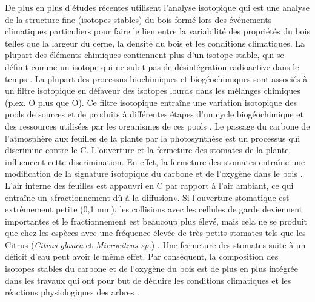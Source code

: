 \documentclass{report}
\begin{document}
De plus en plus d'études récentes utilisent l'analyse isotopique qui est une analyse de la structure fine (isotopes stables) du bois formé lors des événements climatiques particuliers pour faire le lien entre la variabilité des propriétés du bois telles que la largeur du cerne, la densité du bois et les conditions climatiques. La plupart des éléments chimiques contiennent plus d'un isotope stable, qui se définit comme un isotope qui ne subit pas de désintégration radioactive dans le temps \citep{West2006}. La plupart des processus biochimiques et biogéochimiques sont associés à un filtre isotopique en défaveur des isotopes lourds dans les mélanges chimiques (p.ex. O plus que O). Ce filtre isotopique entraîne une variation isotopique des pools de sources et de produits à différentes étapes d'un cycle biogéochimique et des ressources utilisées par les organismes de ces pools \citep{Dawson2002}. Le passage du carbone de l'atmosphère aux feuilles de la plante par la photosynthèse est un processus qui discrimine contre le C. L'ouverture et la fermeture des stomates de la plante influencent cette discrimination. En effet, la fermeture des stomates entraîne une modification de la signature isotopique du carbone et de l'oxygène dans le bois \citep{Farquhar1993, Bigras2005}. L'air interne des feuilles est appauvri en C par rapport à l'air ambiant, ce qui entraîne un «fractionnement dû à la diffusion». Si l'ouverture stomatique est extrêmement petite (0,1 mm), les collisions avec les cellules de garde deviennent importantes et le fractionnement est beaucoup plus élevé, mais cela ne se produit que chez les espèces avec une fréquence élevée de très petits stomates tels que les Citrus (\textit{Citrus glauca} et \textit{Microcitrus sp.}) \citep{Farquhar1993}. Une fermeture des stomates suite à un déficit d'eau peut avoir le même effet. Par conséquent, la composition des isotopes stables du carbone et de l'oxygène du bois est de plus en plus intégrée dans les travaux qui ont pour but de déduire les conditions climatiques et les réactions physiologiques des arbres \citep{McCarroll2004, Sternberg2009,Sarris2013}. \\
\end{document}
